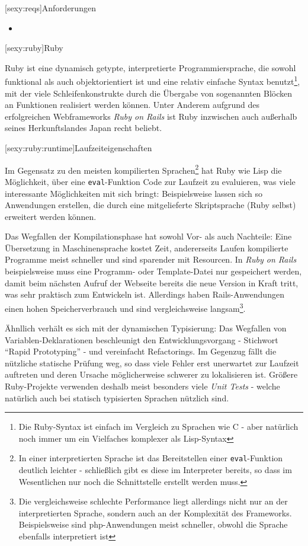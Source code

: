 \documentclass[a4paper, bibgerm]{book}
\newcommand\icode[1]{\lstinline?#1?}
\newcommand\lsection{}
\newcommand\lsubsection{}
\begin{document}
\lsection[sexy:reqs]{Anforderungen}

\begin{itemize}
\item
\end{itemize}

\lsection[sexy:ruby]{Ruby}

Ruby ist eine dynamisch getypte, interpretierte Programmiersprache, die
sowohl funktional als auch objektorientiert ist und eine relativ
einfache Syntax benutzt\footnote{Die Ruby-Syntax ist einfach im
  Vergleich zu Sprachen wie C - aber natürlich noch immer um ein
  Vielfaches komplexer als Lisp-Syntax}, mit der viele
Schleifenkonstrukte durch die Übergabe von sogenannten Blöcken an
Funktionen realisiert werden können.  Unter Anderem aufgrund des
erfolgreichen Webframeworks \textit{Ruby on Rails} ist Ruby inzwischen
auch außerhalb seines Herkunftslandes Japan recht beliebt.

\lsubsection[sexy:ruby:runtime]{Laufzeiteigenschaften}

Im Gegensatz zu den meisten kompilierten Sprachen\footnote{In einer
  interpretierten Sprache ist das Bereitstellen einer
  \icode{eval}-Funktion deutlich leichter - schließlich gibt es diese im
Interpreter bereits, so dass im Wesentlichen nur noch die Schnittstelle
erstellt werden muss.} hat Ruby wie Lisp die
Möglichkeit, über eine \icode{eval}-Funktion Code zur Laufzeit zu
evaluieren, was viele interessante Möglichkeiten mit sich bringt:
Beispielsweise lassen sich so Anwendungen erstellen, die durch eine
mitgelieferte Skriptsprache (Ruby selbst) erweitert werden können.

Das Wegfallen der Kompilationsphase hat sowohl Vor- als auch Nachteile:
Eine Übersetzung in Maschinensprache kostet Zeit, andererseits Laufen
kompilierte Programme meist schneller und sind sparender mit
Resourcen. In \textit{Ruby on Rails} beispielsweise muss eine Programm-
oder Template-Datei nur gespeichert werden, damit beim nächsten Aufruf
der Webseite bereits die neue Version in Kraft tritt, was sehr praktisch
zum Entwickeln ist. Allerdings haben Rails-Anwendungen einen hohen
Speicherverbrauch und sind vergleichsweise langsam\footnote{Die
  vergleichsweise schlechte Performance liegt allerdings nicht nur an
  der interpretierten Sprache, sondern auch an der Komplexität des
  Frameworks. Beispielsweise sind php-Anwendungen meist schneller,
  obwohl die Sprache ebenfalls interpretiert ist}.

Ähnllich verhält es sich mit der dynamischen Typisierung: Das Wegfallen
von Variablen-Deklarationen beschleunigt den Entwicklungsvorgang -
Stichwort "`Rapid Prototyping"' - und vereinfacht Refactorings. Im
Gegenzug fällt die nützliche statische Prüfung weg, so dass viele Fehler
erst unerwartet zur Laufzeit auftreten und deren Ursache möglicherweise
schwerer zu lokalisieren ist. Größere Ruby-Projekte verwenden deshalb meist
besonders viele \textit{Unit Tests} - welche natürlich auch bei statisch
typisierten Sprachen nützlich sind.
\end{document}
